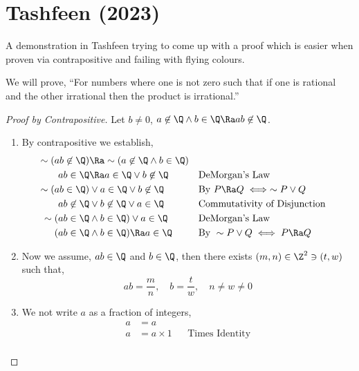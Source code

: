 \documentclass{homework}
\begin{document}
\section{Tashfeen (2023)}

A demonstration in Tashfeen trying to come up with a proof which is easier when proven via contrapositive and failing with flying colours.

We will prove, ``For numbers where one is not zero such that if one is rational and the other irrational then the product is irrational.''

\begin{proof}[Proof by Contrapositive] Let $b\neq0$, $a \not \in \Q \wedge b \in \Q \Ra ab \not \in \Q$.
    \begin{enumerate}
        \item By contrapositive we establish,
              \begin{align*}
                  \sim(ab \not \in \Q) & \Ra \sim(a \not \in \Q \wedge b \in \Q)                                           \\
                  ab \in \Q            & \Ra a \in \Q \vee b \not \in \Q         &  & \text{DeMorgan's Law}                \\
                  \sim(ab \in \Q)      & \vee a \in \Q \vee b \not \in \Q        &  & \text{By } P \Ra Q \iff \sim P\vee Q \\
                  ab \not \in \Q       & \vee b \not \in \Q \vee a \in \Q        &  & \text{Commutativity of Disjunction}  \\
                  \sim (ab \in \Q      & \wedge b \in \Q) \vee a \in \Q          &  & \text{DeMorgan's Law}                \\
                  (ab \in \Q           & \wedge b \in \Q) \Ra a \in \Q           &  & \text{By } \sim P\vee Q \iff P \Ra Q
              \end{align*}
        \item Now we assume, $ab \in \Q$ and $b \in \Q$, then there exists $(m,n) \in \Z^2\ni (t,w)$ such that,
              \[
                  ab = \frac{m}{n},\quad b = \frac{t}{w}, \quad n \neq w \neq 0
              \]
        \item We not write $a$ as a fraction of integers,
              \begin{align*}
                  a & = a                                                         \\
                  a & = a \times 1                     &  & \text{Times Identity} \\

\end{align*}
\end{enumerate}
\end{proof}
\end{document}
